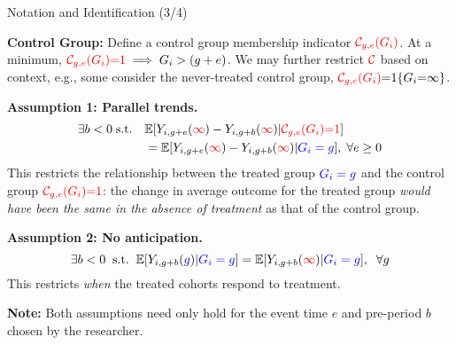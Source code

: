 \documentclass[usenames,dvipsnames]{beamer}
\begin{document}
\begin{frame}{Notation and Identification (3/4)}

\textbf{Control Group:} Define a control group membership indicator ${\color{red} \mathcal{C}_{g,e}(G_i)}$. At a minimum,   $ {\color{red} \mathcal{C}_{g,e}(G_i)  {=} 1} \implies G_i > (g+e)$. We may further restrict ${\color{red} \mathcal{C}}$ based on context, e.g., some  consider the never-treated control group, ${\color{red} \mathcal{C}_{g,e}(G_i)}  {=}  1\{G_i  {=}  \infty\}$.

\textbf{Assumption 1: Parallel trends.}
\begin{equation} \notag
\begin{aligned}
 \exists b<0 \; \text{s.t.} &\quad \mathbb{E}[Y_{i,g+e}({\color{red} \infty}) - Y_{i,g+b}({\color{red} \infty}) | {\color{red} \mathcal{C}_{g,e}(G_i)  {=} 1}] 
\\ &\quad = \mathbb{E}[Y_{i,g+e}({\color{red} \infty}) - Y_{i,g+b}({\color{red} \infty}) | {\color{blue}G_i = g}], \; \forall e \geq 0
\end{aligned}
\end{equation}
This restricts the relationship between the treated group ${\color{blue}G_i = g}$ and the control group ${\color{red} \mathcal{C}_{g,e}(G_i) {=} 1}$: the change in average outcome for the treated group \textit{would have been the same in the absence of treatment} as that of the control group.

\textbf{Assumption 2: No anticipation.} 
\begin{equation} \notag
\exists b<0 \;\; \text{s.t.} \;\; \mathbb{E}[Y_{i,g+b}({\color{blue} g}) | {\color{blue} G_i = g }] = \mathbb{E}[Y_{i,g+b}({\color{red} \infty}) | {\color{blue} G_i = g }] , \;\; \forall g
\end{equation}
This restricts \textit{when} the treated cohorts respond to treatment. 

\textbf{Note:} Both assumptions need only hold for the event time $e$ and pre-period $b$ chosen by the researcher.
 
\end{frame}
\end{document}
